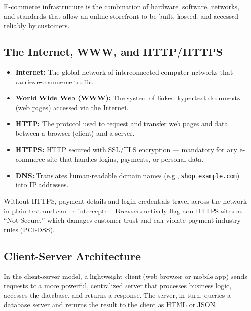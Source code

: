 \documentclass[11pt,a4paper]{article}
\begin{document}
\begin{definitionbox}
E-commerce infrastructure is the combination of hardware, software, networks, and standards that allow an online storefront to be built, hosted, and accessed reliably by customers.
\end{definitionbox}

\subsection{The Internet, WWW, and HTTP/HTTPS}
\begin{itemize}[leftmargin=*]
  \item \textbf{Internet:} The global network of interconnected computer networks that carries e-commerce traffic.
  \item \textbf{World Wide Web (WWW):} The system of linked hypertext documents (web pages) accessed via the Internet.
  \item \textbf{HTTP:} The protocol used to request and transfer web pages and data between a browser (client) and a server.
  \item \textbf{HTTPS:} HTTP secured with SSL/TLS encryption --- mandatory for any e-commerce site that handles logins, payments, or personal data.
  \item \textbf{DNS:} Translates human-readable domain names (e.g., \texttt{shop.example.com}) into IP addresses.
\end{itemize}

\begin{conceptbox}
Without HTTPS, payment details and login credentials travel across the network in plain text and can be intercepted. Browsers actively flag non-HTTPS sites as ``Not Secure,'' which damages customer trust and can violate payment-industry rules (PCI-DSS).
\end{conceptbox}

\subsection{Client-Server Architecture}
\begin{definitionbox}
In the client-server model, a lightweight client (web browser or mobile app) sends requests to a more powerful, centralized server that processes business logic, accesses the database, and returns a response. The server, in turn, queries a database server and returns the result to the client as HTML or JSON.
\end{definitionbox}
\end{document}
